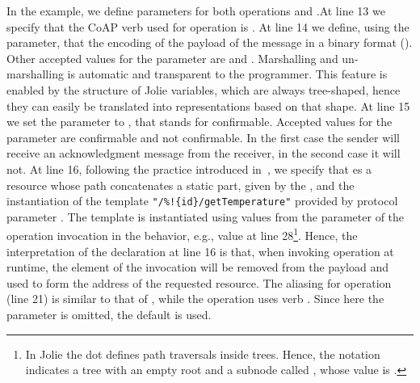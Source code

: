 In the example, we define  parameters for both operations
 and .\@ At line 13 we specify that the CoAP verb
used for operation  is . At line 14 we define, using
the  parameter, that the encoding of the payload of the
message in a binary format (). Other accepted values for
the  parameter are  and .
Marshalling and un-marshalling is automatic and transparent to the programmer.
This feature is enabled by the structure of Jolie variables, which are always
tree-shaped, hence they can easily be translated into representations based on
that shape. At line 15 we set the  parameter to
, that stands for confirmable. Accepted values for the
 parameter are confirmable and not confirmable. In the
first case the sender will receive an acknowledgment message from the
receiver, in the second case it will not. At line 16, following the practice
introduced in~\cite{montesi16}, we specify that  es a
resource whose path concatenates a static part, given by the ,
and the instantiation of the template \lstinline|"/%!{id}/getTemperature"|
provided by protocol parameter . The template is instantiated
using values from the parameter of the operation invocation in the behavior,
e.g., value  at line 28\footnote{In Jolie the dot  defines
path traversals inside trees. Hence, the notation 
indicates a tree with an empty root and a subnode called , whose
value is .}. Hence, the interpretation of the declaration at line 16
is that, when invoking operation  at runtime, the element
 of the invocation will be removed from the payload and used to form
the address of the requested resource. The aliasing for operation
 (line 21) is similar to that of , while the
operation uses verb . Since here the 
parameter is omitted, the default  is used.

